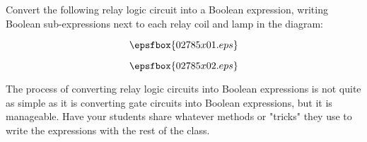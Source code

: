 

Convert the following relay logic circuit into a Boolean expression, writing Boolean sub-expressions next to each relay coil and lamp in the diagram:

\vskip 10pt

$$\epsfbox{02785x01.eps}$$







$$\epsfbox{02785x02.eps}$$







The process of converting relay logic circuits into Boolean expressions is not quite as simple as it is converting gate circuits into Boolean expressions, but it is manageable.  Have your students share whatever methods or "tricks" they use to write the expressions with the rest of the class.




